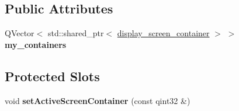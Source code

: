\subsection*{Public Attributes}
\begin{DoxyCompactItemize}
\item 
\mbox{\label{classScreen__manager_ad20150bef59ac873d47c7dccb5062258}} 
Q\+Vector$<$ std\+::shared\+\_\+ptr$<$ \mbox{\hyperlink{classdisplay__screen__container}{display\+\_\+screen\+\_\+container}} $>$ $>$ {\bfseries my\+\_\+containers}
\end{DoxyCompactItemize}
\subsection*{Protected Slots}
\begin{DoxyCompactItemize}
\item 
\mbox{\label{classScreen__manager_a9f814711fe49f63a404758ffb39f63cc}} 
void {\bfseries set\+Active\+Screen\+Container} (const qint32 \&)
\end{DoxyCompactItemize}
